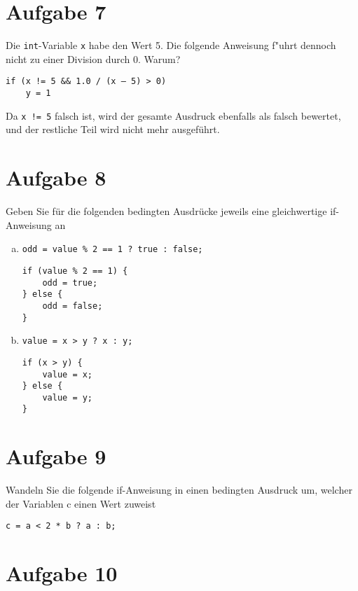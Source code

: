 \documentclass[10pt, oneside]{article}
\begin{document}
\section{Aufgabe 7}

Die \verb+int+-Variable \verb+x+ habe den Wert 5. Die folgende Anweisung f"uhrt
dennoch nicht zu einer Division durch 0. Warum?

\begin{verbatim}
if (x != 5 && 1.0 / (x – 5) > 0)
    y = 1
\end{verbatim}

Da \verb+x != 5+ falsch ist, wird der gesamte Ausdruck ebenfalls als falsch bewertet,
und der restliche Teil wird nicht mehr ausgeführt.

\section{Aufgabe 8}

Geben Sie für die folgenden bedingten Ausdrücke jeweils eine gleichwertige if-
Anweisung an

\begin{enumerate}[(a)]
    \item \verb+odd = value % 2 == 1 ? true : false;+
        \begin{verbatim}
if (value % 2 == 1) {
    odd = true;
} else {
    odd = false;
}
        \end{verbatim}
    \item \verb+value = x > y ? x : y;+
        \begin{verbatim}
if (x > y) {
    value = x;
} else {
    value = y;
}
        \end{verbatim}
\end{enumerate}

\section{Aufgabe 9}

Wandeln Sie die folgende if-Anweisung in einen bedingten Ausdruck um, welcher der
Variablen c einen Wert zuweist

\begin{verbatim}
c = a < 2 * b ? a : b;
\end{verbatim}

\pagebreak

\section{Aufgabe 10}
\end{document}
